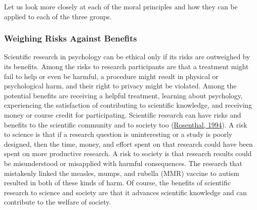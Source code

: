 \documentclass[
]{krantz}
\begin{document}
Let us look more closely at each of the moral principles and how they can be applied to each of the three groups.

\hypertarget{weighing-risks-against-benefits}{%
\subsubsection*{Weighing Risks Against Benefits}\label{weighing-risks-against-benefits}}


Scientific research in psychology can be ethical only if its risks are outweighed by its benefits. Among the risks to research participants are that a treatment might fail to help or even be harmful, a procedure might result in physical or psychological harm, and their right to privacy might be violated. Among the potential benefits are receiving a helpful treatment, learning about psychology, experiencing the satisfaction of contributing to scientific knowledge, and receiving money or course credit for participating. Scientific research can have risks and benefits to the scientific community and to society too (\protect\hyperlink{ref-rosenthal1994science}{Rosenthal, 1994}). A risk to science is that if a research question is uninteresting or a study is poorly designed, then the time, money, and effort spent on that research could have been spent on more productive research. A risk to society is that research results could be misunderstood or misapplied with harmful consequences. The research that mistakenly linked the measles, mumps, and rubella (MMR) vaccine to autism resulted in both of these kinds of harm. Of course, the benefits of scientific research to science and society are that it advances scientific knowledge and can contribute to the welfare of society.
\end{document}
